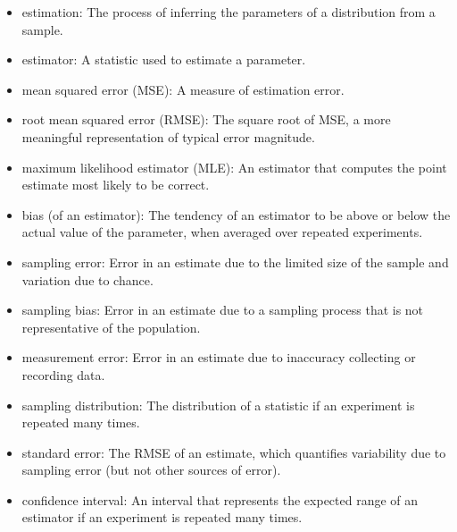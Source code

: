 \documentclass[12pt]{book}
\theoremstyle{exercise}
\begin{document}
\begin{itemize}

\item estimation: The process of inferring the parameters of a distribution
from a sample.%

\item estimator: A statistic used to estimate a parameter.%

\item mean squared error (MSE): A measure of estimation error.%
%

\item root mean squared error (RMSE): The square root of MSE,
a more meaningful representation of typical error magnitude.%
%

\item maximum likelihood estimator (MLE): An estimator that computes the
point estimate most likely to be correct.%
%

\item bias (of an estimator): The tendency of an estimator to be above or
  below the actual value of the parameter, when averaged over repeated
  experiments.%

\item sampling error: Error in an estimate due to the limited
  size of the sample and variation due to chance.%

\item sampling bias: Error in an estimate due to a sampling process
  that is not representative of the population.%

\item measurement error: Error in an estimate due to inaccuracy collecting
  or recording data.%

\item sampling distribution: The distribution of a statistic if an
  experiment is repeated many times.%

\item standard error: The RMSE of an estimate,
which quantifies variability due to sampling error (but not
other sources of error).%

\item confidence interval: An interval that represents the expected
  range of an estimator if an experiment is repeated many times.%
%

\end{itemize}
\end{document}
